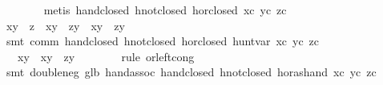 \begin{isabellebody}
\ \ \ \ \ \ \isamarkupfalse%
\ {}metis\ hand{}closed\ hnot{}closed\ hor{}closed\ xc\ yc\ zc{}\isanewline
\isanewline
\ \ \ \ \isamarkupfalse%
\ {}x{}{}y\ {}\ z{}\ {}\ x{}{}y\ {}\ z{}{}y\ {}\ x{}{}y\ {}\ z{}{}{}y{}\isanewline
\ \ \ \ \ \ \isamarkupfalse%
\ {}smt\ comm\ hand{}closed\ hnot{}closed\ hor{}closed\ hunt{}var\ xc\ yc\ zc{}\isanewline
\ \ \ \ \isamarkupfalse%
\ \isamarkupfalse%
\ {}{}{}{}\ {}\ x{}y\ {}\ x{}{}y\ {}\ z{}{}{}y{}\isanewline
\ \ \ \ \ \ \isamarkupfalse%
\ {}rule\ or{}left{}cong{}\isanewline
\ \ \ \ \ \ \isamarkupfalse%
\ {}smt\ double{}neg\ glb{}\ hand{}assoc\ hand{}closed\ hnot{}closed\ hor{}as{}hand\ xc\ yc\ zc{}\isanewline

\end{isabellebody}
